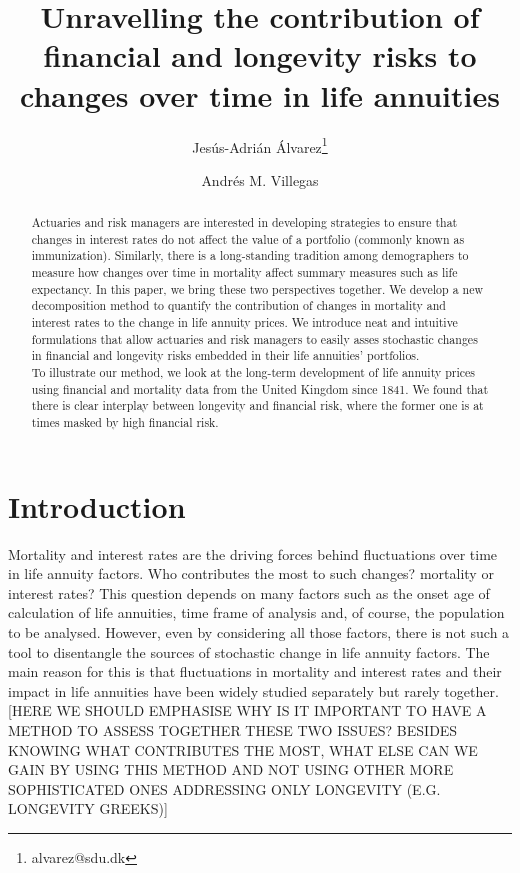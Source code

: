 \documentclass[12pt]{article}
\title{Unravelling the contribution of financial and longevity risks to changes over time in life annuities}
\author[1]{Jes\'us-Adri\'an \'Alvarez\thanks{alvarez@sdu.dk}}
\author[2]{Andr\'es M. Villegas}
\affil[1]{{\small Interdisciplinary Centre on Population Dynamics, University of Southern Denmark} }
\affil[2]{\small{School of Risk and Actuarial Studies and ARC Centre of Excellence in Population Ageing Research (CEPAR)\\ UNSW Business School, Sydney, Australia}}
\begin{document}
\maketitle

{
\setcounter{tocdepth}{2}
}



\begin{abstract}
	Actuaries and risk managers are interested in developing strategies to ensure that changes in interest rates do not affect the value of a portfolio (commonly known as immunization). Similarly, there is a long-standing tradition among demographers to measure how changes over time in mortality affect summary measures such as life expectancy. In this paper, we bring these two perspectives together. We develop a new decomposition method to quantify the contribution of changes in mortality and interest rates to the change in life annuity prices. We introduce neat and intuitive formulations that allow actuaries and risk managers to easily asses stochastic changes in financial and longevity risks embedded in their life annuities' portfolios. \\
	
	To illustrate our method, we look at the long-term development of life annuity prices using financial and mortality data from the United Kingdom since 1841. We found that there is clear interplay between longevity and financial risk, where the former one is at times masked by high financial risk. 
\end{abstract}
\newpage
\section{Introduction}\label{introduction}


Mortality and interest rates are the driving forces behind fluctuations over time in life annuity factors. Who contributes the most to such changes? mortality or interest rates? This question depends on many factors such as the onset age of calculation of life annuities, time frame of analysis and, of course, the population to be analysed. However, even by considering all those factors, there is not such a tool to disentangle the sources of stochastic change in life annuity factors. The main reason for this is that fluctuations in mortality and interest rates and their impact in life annuities have been widely studied separately but rarely together.[HERE WE SHOULD EMPHASISE WHY IS IT IMPORTANT TO HAVE A METHOD TO ASSESS TOGETHER THESE TWO ISSUES? BESIDES KNOWING WHAT CONTRIBUTES THE MOST, WHAT ELSE CAN WE GAIN BY USING THIS METHOD AND NOT USING OTHER MORE SOPHISTICATED ONES ADDRESSING ONLY LONGEVITY (E.G. LONGEVITY GREEKS)]
\end{document}
